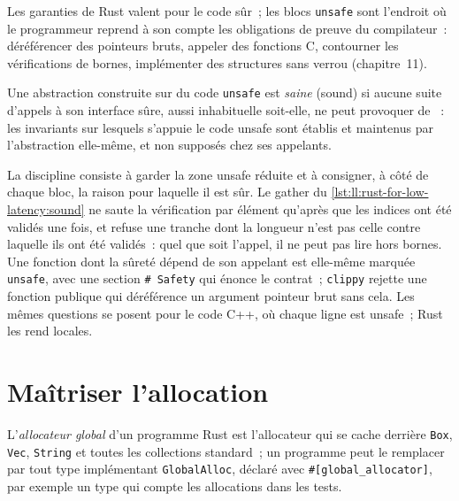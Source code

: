 Les garanties de Rust valent pour le code sûr~; les blocs \texttt{unsafe} sont l'endroit où le programmeur reprend à son compte les
obligations de preuve du compilateur~: déréférencer des pointeurs bruts, appeler des fonctions C, contourner les vérifications de bornes,
implémenter des structures sans verrou (chapitre~11).

\begin{definition}\label{def:ll:rust-for-low-latency:sound}
Une abstraction construite sur du code \texttt{unsafe} est \emph{saine} (sound) si aucune suite d'appels à son interface
sûre, aussi inhabituelle soit-elle, ne peut provoquer de ~: les invariants sur lesquels s'appuie le code unsafe sont
établis et maintenus par l'abstraction elle-même, et non supposés chez ses appelants.
\end{definition}

La discipline consiste à garder la zone unsafe réduite et à consigner, à côté de chaque bloc, la raison pour laquelle il est sûr. Le
gather du \cref{lst:ll:rust-for-low-latency:sound} ne saute la vérification par élément qu'après que les indices ont été validés
une fois, et refuse une tranche dont la longueur n'est pas celle contre laquelle ils ont été validés~: quel que soit l'appel, il ne peut
pas lire hors bornes. Une fonction dont la sûreté dépend de son appelant est elle-même marquée \texttt{unsafe}, avec une section
\texttt{\# Safety} qui énonce le contrat~; \texttt{clippy} rejette une fonction publique qui déréférence un argument pointeur brut sans cela.
Les mêmes questions se posent pour le code C++, où chaque ligne est unsafe~; Rust les rend locales.

\label{lst:ll:rust-for-low-latency:sound}

\section{Maîtriser l'allocation}

\begin{definition}\label{def:ll:rust-for-low-latency:alloc}
L'\emph{allocateur global} d'un programme Rust est l'allocateur qui se cache derrière \texttt{Box}, \texttt{Vec},
\texttt{String} et toutes les collections standard~; un programme peut le remplacer par tout type implémentant \texttt{GlobalAlloc},
déclaré avec \texttt{\#[global\_allocator]}, par exemple un type qui compte les allocations dans les tests.
\end{definition}

